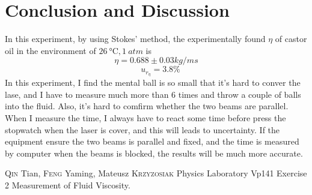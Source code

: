 \documentclass[12pt]{article}
\begin{document}
\section{Conclusion and Discussion}
    In this experiment, by using  Stokes' method, the experimentally found $\eta$ of castor oil in the environment of $\SI{26}{\degreeCelsius}, 1\ atm$ is
        $$\eta=0.688\pm 0.03 kg/m s$$
        $$\quad u_{r_{\eta}}=3.8\%$$
    In this experiment, I find the mental ball is so small that it's hard to conver the lase, and I have to measure much more than 6 times and throw a couple of balls into the fluid. Also, it's hard to comfirm whether the two beams are parallel. When I measure the time, I always have to react some time before press the stopwatch when the laser is cover, and this will leads to uncertainty. If the equipment ensure the two beams is parallel and fixed, and the time is measured by computer when the beams is blocked, the results will be much more accurate.
\begin{thebibliography}{99}
     \textsc{Qin} Tian, \textsc{Feng} Yaming, Mateusz \textsc{Krzyzosiak} Physics Laboratory Vp141 Exercise 2 Measurement of Fluid Viscosity.
\end{thebibliography}
\end{document}
